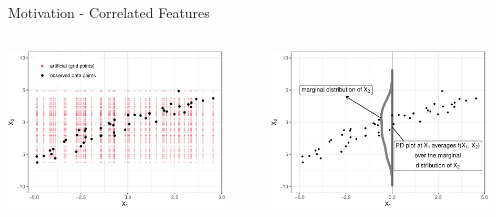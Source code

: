 \documentclass[11pt,compress,t,notes=noshow, aspectratio=169, xcolor=table]{beamer}
\begin{document}
\begin{frame}{Motivation - Correlated Features}

\begin{columns}[T]
\begin{column}{0.5\textwidth}
\centering
\includegraphics[width=0.9\textwidth]{figure/ale_scatter_grid}
\end{column}
\begin{column}{0.5\textwidth}
\centering
\includegraphics[width=0.9\textwidth]{figure/ale_pdplot}
\end{column}
\end{columns}




\end{frame}
\end{document}
